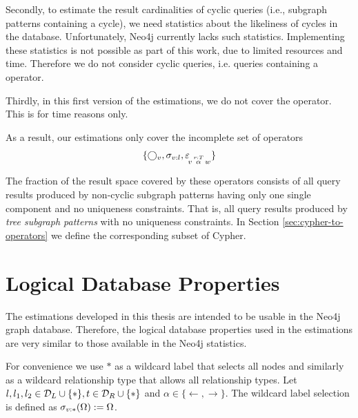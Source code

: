 Secondly, to estimate the result cardinalities of cyclic queries
(i.e., subgraph patterns containing a cycle), we
need statistics about the likeliness of cycles in the database.
Unfortunately, Neo4j currently lacks such statistics.
Implementing these statistics is not possible as part of this
work, due to limited resources and time.
Therefore we do not consider cyclic queries, i.e. queries containing
a  operator.

Thirdly, in this first version of the estimations, we do not cover the
 operator. This is for time reasons only.

As a result, our estimations only cover the incomplete set of operators
\[
  \{ \bigcirc_{v}, \sigma_{v:l},
     \varepsilon\!_{v\, \overset{r:T}{\alpha} \, w} \}
\]

The fraction of the result space covered by these operators consists of all
query results produced by non-cyclic subgraph patterns having only one
single component and no uniqueness constraints.
That is, all query results produced by \emph{tree subgraph patterns} with no
uniqueness constraints.
In Section \ref{sec:cypher-to-operators} we define the corresponding subset of
Cypher.

\section{Logical Database Properties}
\label{sec:logical-database-props}

The estimations developed in this thesis are intended to be usable in the Neo4j
graph database. Therefore, the logical database properties used in the
estimations are very similar to those available in the Neo4j statistics.

For convenience we use $*$ as a wildcard label that selects all nodes and
similarly as a wildcard relationship type that allows all relationship types.
Let $l, l_1, l_2 \in \mathcal{D}_L \cup \{ * \}, t \in \mathcal{D}_R \cup \{ * \}$ and
$\alpha \in \{\leftarrow, \rightarrow \}$.
The wildcard label selection is defined as $\sigma_{v:*}(\Omega) := \Omega$.

